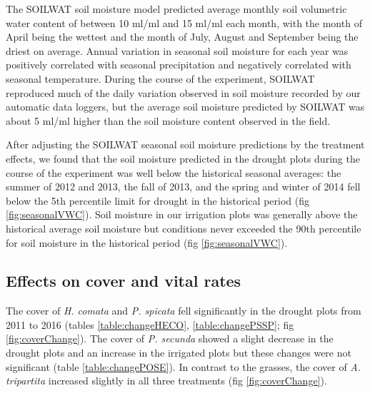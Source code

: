 \documentclass[11pt]{article}
\begin{document}
\begin{doublespacing}
The SOILWAT soil moisture model predicted average monthly soil volumetric water content of between 10 ml/ml and 15 ml/ml each month, with the month of April being the wettest and the month of July, August and September being the driest on average. Annual variation in seasonal soil moisture for each year was positively correlated with seasonal precipitation and negatively correlated with seasonal temperature. During the course of the experiment, SOILWAT reproduced much of the daily variation observed in soil moisture recorded by our automatic data loggers, but the average soil moisture predicted by SOILWAT was about 5 ml/ml higher than the soil moisture content observed in the field.  

After adjusting the SOILWAT seasonal soil moisture predictions by the treatment effects, we found that the soil moisture predicted in the drought plots during the course of the experiment was well below the historical seasonal averages: the summer of 2012 and 2013, the fall of 2013, and the spring and winter of 2014 fell below the 5th percentile limit for drought in the historical period (fig \ref{fig:seasonalVWC}). Soil moisture in our irrigation plots was generally above the historical average soil moisture but conditions never exceeded the 90th percentile for soil moisture in the historical period (fig \ref{fig:seasonalVWC}). 

\subsection*{Effects on cover and vital rates}

The cover of \textit{H. comata} and \textit{P. spicata} fell significantly in the drought plots from 2011 to 2016 (tables \ref{table:changeHECO}, \ref{table:changePSSP}; fig \ref{fig:coverChange}). The cover of \textit{P. secunda} showed a slight decrease in the drought plots and an increase in the irrigated plots but these changes were not significant (table \ref{table:changePOSE}).  In contrast to the grasses, the cover of \textit{A. tripartita} increased slightly in all three treatments (fig \ref{fig:coverChange}). 


\end{doublespacing}
\end{document}
